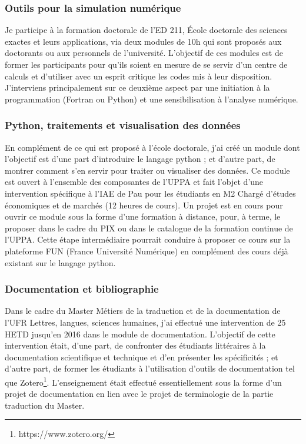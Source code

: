 \documentclass[11pt]{artuppax}
\newcounter{subsec}[section]
\begin{document}
\subsubsection{Outils pour la simulation numérique}

Je participe à la formation doctorale de l'ED 211, École doctorale des sciences exactes
et leurs applications, via deux modules de 10h qui sont proposés aux doctorants ou
aux personnels de l'université. L'objectif de ces modules est de former les participants
pour qu'ils soient en mesure de se servir d'un centre de calculs et d'utiliser avec
un esprit critique les codes mis à leur disposition. J'interviens principalement sur
ce deuxième aspect par une initiation à la programmation (Fortran ou Python) et une
sensibilisation à l'analyse numérique.

\subsubsection{Python, traitements et visualisation des données}

En complément de ce qui est proposé à l'école doctorale, j'ai créé un module dont
l'objectif est d'une part d'introduire le langage python ; et d'autre part, de
montrer comment s'en servir pour traiter ou visualiser des données. Ce module
est ouvert à l'ensemble des composantes de l'UPPA et fait l'objet d'une
intervention spécifique
à l'IAE de Pau pour les étudiants en M2 Chargé d'études économiques et de marchés (12 heures de cours).
Un projet est en cours pour ouvrir ce module sous la forme d'une formation à distance,
pour, à terme, le proposer dans le cadre du PIX ou dans le catalogue de la formation continue de l'UPPA.
Cette étape intermédiaire pourrait conduire à proposer ce cours sur
la plateforme FUN (France Université Numérique) en complément des cours déjà existant sur
le langage python.

\subsubsection{Documentation et bibliographie}

Dans le cadre du Master Métiers de la traduction et de la documentation de l'UFR Lettres,
langues, sciences humaines, j'ai effectué une intervention de 25 HETD jusqu'en 2016 dans
le module de documentation. L'objectif de cette intervention
était, d'une part, de confronter des étudiants littéraires à la documentation scientifique
et technique
et d'en présenter les spécificités ; et d'autre part, de former les étudiants à
l'utilisation d'outils de documentation tel que Zotero\footnote{https://www.zotero.org/}.
L'enseignement était effectué
essentiellement sous la forme d'un projet de documentation en lien
avec le projet de terminologie de la partie traduction du Master.
\end{document}
